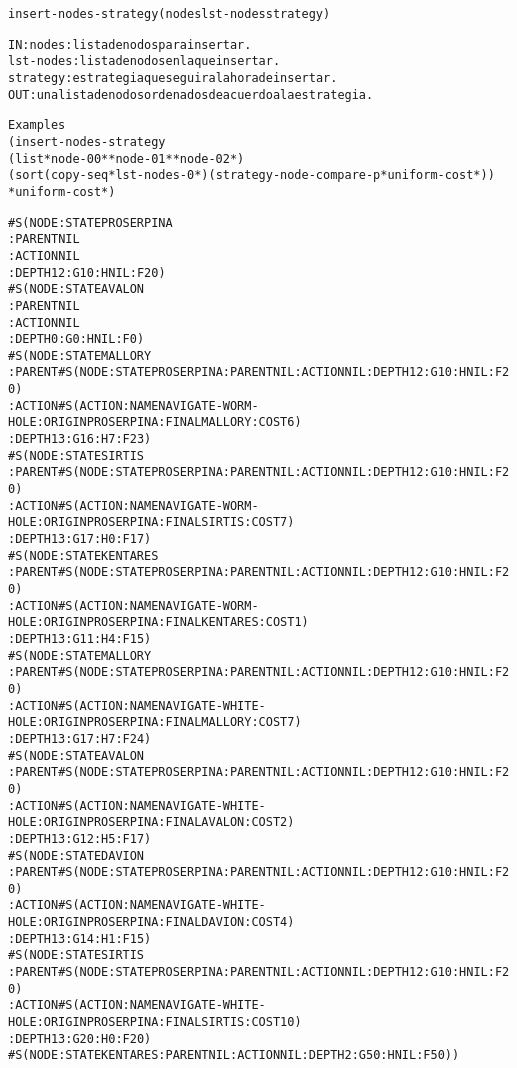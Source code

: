 \begin{aibox}{\function}
\begin{alltt}
insert-nodes-strategy (nodes lst-nodes strategy)


IN:     nodes: lista de nodos para insertar.
       lst-nodes:    lista de nodos en la que insertar.
       strategy:    estrategia que seguir a la hora de insertar.
OUT:    una lista de nodos ordenados de acuerdo a la estrategia.

\end{alltt}
\end{aibox}

\begin{aibox}{\examples}
\begin{alltt}
Examples
(insert-nodes-strategy 
    (list *node-00* *node-01* *node-02*)
    (sort (copy-seq *lst-nodes-0*) (strategy-node-compare-p *uniform-cost*))
    *uniform-cost*)

\#S(NODE :STATE PROSERPINA 
 :PARENT NIL
 :ACTION NIL
 :DEPTH 12 :G 10 :H NIL :F 20)
\#S(NODE :STATE AVALON 
 :PARENT NIL
 :ACTION NIL
 :DEPTH 0 :G 0 :H NIL :F 0)
\#S(NODE :STATE MALLORY
 :PARENT \#S(NODE :STATE PROSERPINA :PARENT NIL :ACTION NIL :DEPTH 12 :G 10 :H NIL :F 20)
 :ACTION \#S(ACTION :NAME NAVIGATE-WORM-HOLE :ORIGIN PROSERPINA :FINAL MALLORY :COST 6)
 :DEPTH 13 :G 16 :H 7 :F 23)
\#S(NODE :STATE SIRTIS
 :PARENT \#S(NODE :STATE PROSERPINA :PARENT NIL :ACTION NIL :DEPTH 12 :G 10 :H NIL :F 20)
 :ACTION \#S(ACTION :NAME NAVIGATE-WORM-HOLE :ORIGIN PROSERPINA :FINAL SIRTIS :COST 7)
 :DEPTH 13 :G 17 :H 0 :F 17)
\#S(NODE :STATE KENTARES
 :PARENT \#S(NODE :STATE PROSERPINA :PARENT NIL :ACTION NIL :DEPTH 12 :G 10 :H NIL :F 20)
 :ACTION \#S(ACTION :NAME NAVIGATE-WORM-HOLE :ORIGIN PROSERPINA :FINAL KENTARES :COST 1)
 :DEPTH 13 :G 11 :H 4 :F 15)
\#S(NODE :STATE MALLORY
 :PARENT \#S(NODE :STATE PROSERPINA :PARENT NIL :ACTION NIL :DEPTH 12 :G 10 :H NIL :F 20)
 :ACTION \#S(ACTION :NAME NAVIGATE-WHITE-HOLE :ORIGIN PROSERPINA :FINAL MALLORY :COST 7)
 :DEPTH 13 :G 17 :H 7 :F 24)
\#S(NODE :STATE AVALON
 :PARENT \#S(NODE :STATE PROSERPINA :PARENT NIL :ACTION NIL :DEPTH 12 :G 10 :H NIL :F 20)
 :ACTION \#S(ACTION :NAME NAVIGATE-WHITE-HOLE :ORIGIN PROSERPINA :FINAL AVALON :COST 2)
 :DEPTH 13 :G 12 :H 5 :F 17)
\#S(NODE :STATE DAVION
 :PARENT \#S(NODE :STATE PROSERPINA :PARENT NIL :ACTION NIL :DEPTH 12 :G 10 :H NIL :F 20)
 :ACTION \#S(ACTION :NAME NAVIGATE-WHITE-HOLE :ORIGIN PROSERPINA :FINAL DAVION :COST 4)
 :DEPTH 13 :G 14 :H 1 :F 15)
\#S(NODE :STATE SIRTIS
 :PARENT \#S(NODE :STATE PROSERPINA :PARENT NIL :ACTION NIL :DEPTH 12 :G 10 :H NIL :F 20)
 :ACTION \#S(ACTION :NAME NAVIGATE-WHITE-HOLE :ORIGIN PROSERPINA :FINAL SIRTIS :COST 10)
 :DEPTH 13 :G 20 :H 0 :F 20)
\#S(NODE :STATE KENTARES :PARENT NIL :ACTION NIL :DEPTH 2 :G 50 :H NIL :F 50))



\end{alltt}
\end{aibox}

